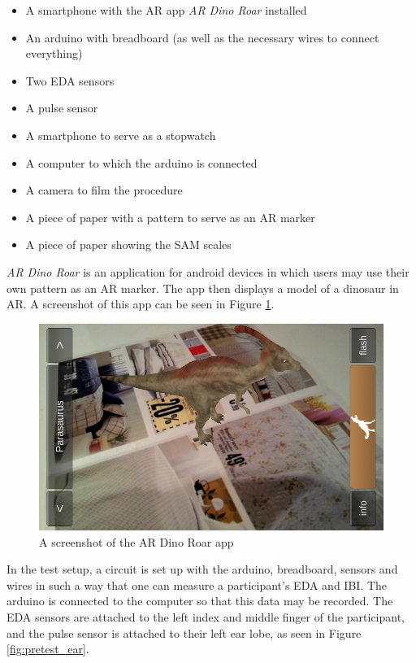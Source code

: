 \begin{itemize}
    \item A smartphone with the AR app \textit{AR Dino Roar} installed
    \item An arduino with breadboard (as well as the necessary wires to connect everything)
    \item Two EDA sensors
    \item A pulse sensor
    \item A smartphone to serve as a stopwatch
    \item A computer to which the arduino is connected
    \item A camera to film the procedure
    \item A piece of paper with a pattern to serve as an AR marker
    \item A piece of paper showing the SAM scales
\end{itemize}

\textit{AR Dino Roar} is an application for android devices in which users may use their own pattern as an AR marker. The app then displays a model of a dinosaur in AR. A screenshot of this app can be seen in Figure \ref{fig:dino}.

\begin{figure}[h!]
	\centering
    \includegraphics[scale=0.4]{figures/AR_dino.png}
    \caption{A screenshot of the AR Dino Roar app \cite{ARDino}}\label{fig:dino}
\end{figure}

In the test setup, a circuit is set up with the arduino, breadboard, sensors and wires in such a way that one can measure a participant’s EDA and IBI. The arduino is connected to the computer so that this data may be recorded. The EDA sensors are attached to the left index and middle finger of the participant, and the pulse sensor is attached to their left ear lobe, as seen in Figure \ref{fig:pretest_ear}.

